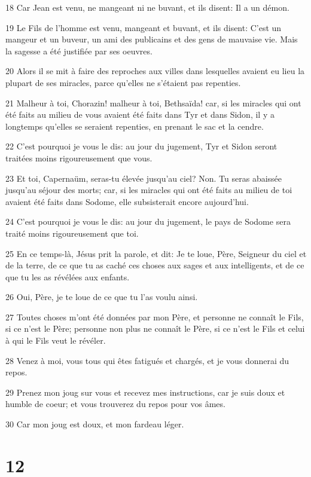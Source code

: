 \par 18 Car Jean est venu, ne mangeant ni ne buvant, et ils disent: Il a un démon.
\par 19 Le Fils de l'homme est venu, mangeant et buvant, et ils disent: C'est un mangeur et un buveur, un ami des publicains et des gens de mauvaise vie. Mais la sagesse a été justifiée par ses oeuvres.
\par 20 Alors il se mit à faire des reproches aux villes dans lesquelles avaient eu lieu la plupart de ses miracles, parce qu'elles ne s'étaient pas repenties.
\par 21 Malheur à toi, Chorazin! malheur à toi, Bethsaïda! car, si les miracles qui ont été faits au milieu de vous avaient été faits dans Tyr et dans Sidon, il y a longtemps qu'elles se seraient repenties, en prenant le sac et la cendre.
\par 22 C'est pourquoi je vous le dis: au jour du jugement, Tyr et Sidon seront traitées moins rigoureusement que vous.
\par 23 Et toi, Capernaüm, seras-tu élevée jusqu'au ciel? Non. Tu seras abaissée jusqu'au séjour des morts; car, si les miracles qui ont été faits au milieu de toi avaient été faits dans Sodome, elle subsisterait encore aujourd'hui.
\par 24 C'est pourquoi je vous le dis: au jour du jugement, le pays de Sodome sera traité moins rigoureusement que toi.
\par 25 En ce temps-là, Jésus prit la parole, et dit: Je te loue, Père, Seigneur du ciel et de la terre, de ce que tu as caché ces choses aux sages et aux intelligents, et de ce que tu les as révélées aux enfants.
\par 26 Oui, Père, je te loue de ce que tu l'as voulu ainsi.
\par 27 Toutes choses m'ont été données par mon Père, et personne ne connaît le Fils, si ce n'est le Père; personne non plus ne connaît le Père, si ce n'est le Fils et celui à qui le Fils veut le révéler.
\par 28 Venez à moi, vous tous qui êtes fatigués et chargés, et je vous donnerai du repos.
\par 29 Prenez mon joug sur vous et recevez mes instructions, car je suis doux et humble de coeur; et vous trouverez du repos pour vos âmes.
\par 30 Car mon joug est doux, et mon fardeau léger.

\chapter{12}


